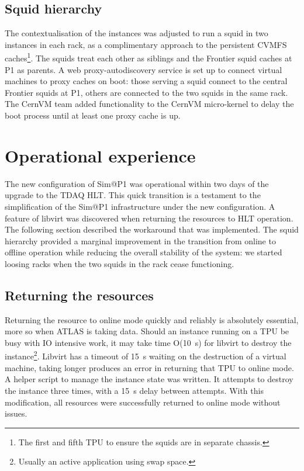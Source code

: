 \documentclass{webofc}
\begin{document}
\subsection{Squid hierarchy}
\label{sec:hierarchy}
The contextualisation of the instances was adjusted to run a squid in two
instances in each rack, as a complimentary approach to the persistent CVMFS
caches\footnote{The first and fifth TPU to ensure the squids are in
separate chassis.}. The squids treat each other as siblings and the Frontier
squid caches at P1 as parents. A web proxy-autodiscovery service is set up to
connect virtual machines to proxy caches on boot: those serving a squid
connect to the central Frontier squids at P1, others are connected to the two
squids in the same rack. The CernVM team added functionality to the CernVM
micro-kernel to delay the boot process until at least one proxy cache is up.


\section{Operational experience}
\label{sec:ops}
The new configuration of Sim@P1 was operational within two days of the upgrade
to the TDAQ HLT. This quick transition is a testament to the simplification of
the Sim@P1 infrastructure under the new configuration. A feature of libvirt was
discovered when
returning the resources to HLT operation. The following section described the
workaround that was implemented. The squid hierarchy provided a marginal
improvement in the transition from online to offline operation while reducing
the
overall stability of the system: we started loosing racks when the two squids in
the rack cease functioning.

\subsection{Returning the resources}
\label{sec:return}
Returning the resource to online mode quickly and reliably is absolutely
essential, more so when ATLAS is taking data.
Should an instance running on a TPU be busy with IO intensive work, it may take
time O(10~\textrm{s}) for libvirt to destroy the instance\footnote{Usually an
active application using swap space.}. Libvirt has a timeout of
15~\textrm{s} waiting
on the destruction of a virtual machine, taking longer produces an error in
returning that TPU to online mode. A helper script to manage the instance state
was written. It attempts to destroy the instance three
times, with a 15~\textrm{s} delay between attempts. With this modification, all
resources were successfully returned to online mode without issues.
\end{document}

